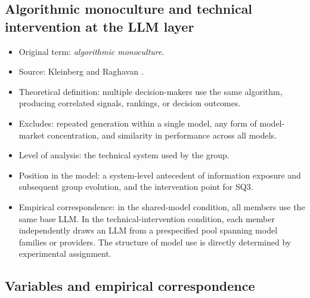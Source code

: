 \documentclass[11pt,a4paper]{article}
\newcommand{\term}[1]{\textit{#1}}
\begin{document}
\subsection{Algorithmic monoculture and technical intervention at the LLM layer}

\begin{itemize}
\item Original term: \term{algorithmic monoculture}.
\item Source: Kleinberg and Raghavan \cite{kleinberg2021}.
\item Theoretical definition: multiple decision-makers use the same algorithm, producing correlated signals, rankings, or decision outcomes.
\item Excludes: repeated generation within a single model, any form of model-market concentration, and similarity in performance across all models.
\item Level of analysis: the technical system used by the group.
\item Position in the model: a system-level antecedent of information exposure and subsequent group evolution, and the intervention point for SQ3.
\item Empirical correspondence: in the shared-model condition, all members use the same base LLM. In the technical-intervention condition, each member independently draws an LLM from a prespecified pool spanning model families or providers. The structure of model use is directly determined by experimental assignment.
\end{itemize}

\subsection{Variables and empirical correspondence}
\end{document}
